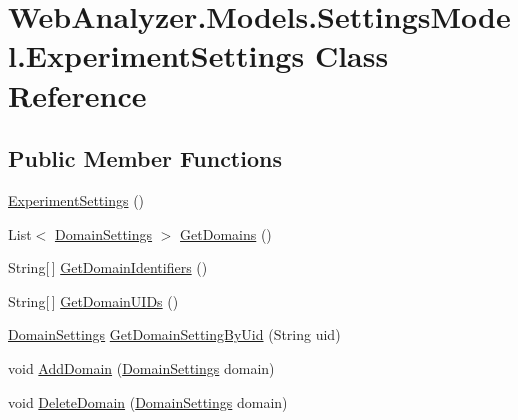 \hypertarget{class_web_analyzer_1_1_models_1_1_settings_model_1_1_experiment_settings}{}\section{Web\+Analyzer.\+Models.\+Settings\+Model.\+Experiment\+Settings Class Reference}
\label{class_web_analyzer_1_1_models_1_1_settings_model_1_1_experiment_settings}
\subsection*{Public Member Functions}
\begin{DoxyCompactItemize}
\item 
\hyperlink{class_web_analyzer_1_1_models_1_1_settings_model_1_1_experiment_settings_a98955573a3878cfba75a880da391ac97}{Experiment\+Settings} ()
\item 
List$<$ \hyperlink{class_web_analyzer_1_1_models_1_1_settings_model_1_1_domain_settings}{Domain\+Settings} $>$ \hyperlink{class_web_analyzer_1_1_models_1_1_settings_model_1_1_experiment_settings_a742964a9fce4abd6504b4894f25a845b}{Get\+Domains} ()
\item 
String\mbox{[}$\,$\mbox{]} \hyperlink{class_web_analyzer_1_1_models_1_1_settings_model_1_1_experiment_settings_a10c72f98c76544417bd84988a55dc2c2}{Get\+Domain\+Identifiers} ()
\item 
String\mbox{[}$\,$\mbox{]} \hyperlink{class_web_analyzer_1_1_models_1_1_settings_model_1_1_experiment_settings_a21c34742e9bcd0fedd0cec8bfb40bf00}{Get\+Domain\+U\+I\+Ds} ()
\item 
\hyperlink{class_web_analyzer_1_1_models_1_1_settings_model_1_1_domain_settings}{Domain\+Settings} \hyperlink{class_web_analyzer_1_1_models_1_1_settings_model_1_1_experiment_settings_aca31542aa283999bfb472444b7e4a565}{Get\+Domain\+Setting\+By\+Uid} (String uid)
\item 
void \hyperlink{class_web_analyzer_1_1_models_1_1_settings_model_1_1_experiment_settings_ae886e26f8cb954a739fa2e1fc5b224a4}{Add\+Domain} (\hyperlink{class_web_analyzer_1_1_models_1_1_settings_model_1_1_domain_settings}{Domain\+Settings} domain)
\item 
void \hyperlink{class_web_analyzer_1_1_models_1_1_settings_model_1_1_experiment_settings_aae6124a9d932400b4430ee4c0bd226f7}{Delete\+Domain} (\hyperlink{class_web_analyzer_1_1_models_1_1_settings_model_1_1_domain_settings}{Domain\+Settings} domain)

\end{DoxyCompactItemize}
